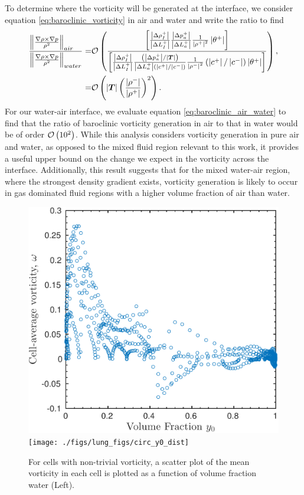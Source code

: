 To determine where the vorticity will be generated at the interface,
we consider equation \eqref{eq:baroclinic_vorticity} in air and water
and write the ratio to find
\begin{align}%
  \label{eq:baroclinic_air_water}%
  \frac{\norm{\frac{\nabla\rho\times\nabla p}{\rho^2}}_{air\quad}}{\norm{\frac{\nabla\rho\times\nabla p}{\rho^2}}_{water}}
  =&\orderof{\frac{\left[\frac{\abs{\Delta \rho_I^+}}{\abs{\Delta L_I^+}}\frac{\abs{\Delta p_a^+}}{\abs{\Delta L_a^+}}\frac{1}{\abs{\rho^+}^2}\abs{\theta^+}\right]}
     {\left[\frac{\abs{\Delta \rho_I^+}}{\abs{\Delta L_I^+}}\frac{\left(\abs{\Delta p_a^+}/\abs{\bs{T}}\right)}{\abs{\Delta L_a^+}\left(\abs{c^+}/\abs{c^-}\right)}\frac{1}{\abs{\rho^-}^2}\left(\abs{c^+}/\abs{c^-}\right)\abs{\theta^+}\right]}},\nonumber\\%
  =&\orderof{\abs{\bs{T}}\left(\frac{\abs{\rho^-}}{\abs{\rho^+}}\right)^2}.%
\end{align}
For our water-air interface, we evaluate equation
\eqref{eq:baroclinic_air_water} to find that the ratio of baroclinic
vorticity generation in air to that in water would be of order
$\mathcal{O}\left(10^2\right)$. While this analysis considers vorticity generation
in pure air and water, as opposed to the mixed fluid region relevant
to this work, it provides a useful upper bound on the change we expect
in the vorticity across the interface. Additionally, this result
suggests that for the mixed water-air region, where the strongest
density gradient exists, vorticity generation is likely to occur in
gas dominated fluid regions with a higher volume fraction of air than
water.
\begin{figure}[h]
  \centering
  \includegraphics[width=.38\textwidth]{./figs/lung_figs/vorticity_vs_y0} \hfill
  \texttt{[image: ./figs/lung\_figs/circ\_y0\_dist]}
  \caption{For cells with non-trivial vorticity, a scatter plot of the mean vorticity in each cell is plotted as a function of volume fraction water (Left).  }
  \label{fig:baroclinic_y0_distribution}  
\end{figure}
